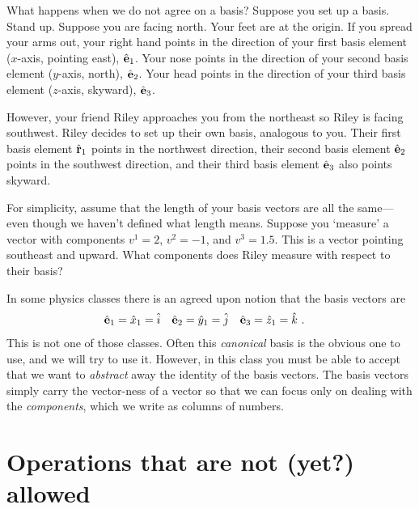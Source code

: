 \begin{exercise}
What happens when we do not agree on a basis? Suppose you set up a basis. Stand up. Suppose you are facing north. Your feet are at the origin. If you spread your arms out, your right hand points in the direction of your first basis element ($x$-axis, pointing east), ${\hat{\mathbf{e}}}_1$. Your nose points in the direction of your second basis element ($y$-axis, north), ${\hat{\mathbf{e}}}_2$. Your head points in the direction of your third basis element ($z$-axis, skyward), ${\hat{\mathbf{e}}}_3$.

However, your friend Riley approaches you from the northeast so Riley is facing southwest. Riley decides to set up their own basis, analogous to you. Their first basis element ${\hat{\mathbf{r}}}_1$ points in the northwest direction, their second basis element ${\hat{\mathbf{e}}}_2$ points in the southwest direction, and their third basis element ${\hat{\mathbf{e}}}_3$ also points skyward. 

For simplicity, assume that the length of your basis vectors are all the same---even though we haven't defined what length means. Suppose you `measure' a vector with components $v^1 = 2$, $v^2=-1$, and $v^3=1.5$. This is a vector pointing southeast and upward. What components does Riley measure with respect to their basis?
\end{exercise}



In some physics classes there is an agreed upon notion that the basis vectors are 
\begin{align}
    \hat{\mathbf{e}}_1 &= \hat x_1 = \hat i
    &
    \hat{\mathbf{e}}_2 &= \hat y_1 = \hat j
    &
    \hat{\mathbf{e}}_3 &= \hat z_1 = \hat k \ .
\end{align}
This is not one of those classes. Often this \emph{canonical} basis is the obvious one to use, and we will try to use it. However, in this class you must be able to accept that we want to \emph{abstract} away the identity of the basis vectors. The basis vectors simply carry the vector-ness of a vector so that we can focus only on dealing with the \emph{components}, which we write as columns of numbers.




\section{Operations that are not (yet?) allowed}

